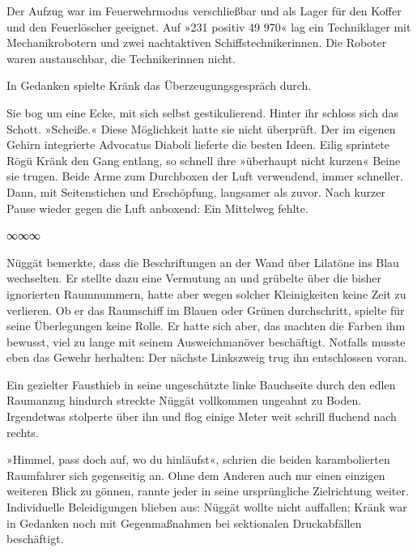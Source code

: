 Der Aufzug war im Feuerwehrmodus verschließbar und als Lager für den Koffer und den Feuerlöscher geeignet. Auf »231 positiv 49 970« lag ein Techniklager mit Mechanikrobotern und zwei nachtaktiven Schiffstechnikerinnen. Die Roboter waren austauschbar, die Technikerinnen nicht.

In Gedanken spielte Kränk das Überzeugungsgespräch durch. 

Sie bog um eine Ecke, mit sich selbst gestikulierend.  Hinter ihr schloss sich das Schott. »Scheiße.« Diese Möglichkeit hatte sie nicht überprüft. Der im eigenen Gehirn integrierte Advocatus Diaboli lieferte die besten Ideen. Eilig sprintete Rögü Kränk den Gang entlang, so schnell ihre »überhaupt nicht kurzen« Beine sie trugen. Beide Arme zum Durchboxen der Luft verwendend, immer schneller. Dann, mit Seitenstichen und Erschöpfung, langsamer als zuvor. Nach kurzer Pause wieder gegen die Luft anboxend: Ein Mittelweg fehlte.

\begin{center}
	∞∞∞
\end{center}

Nüggät bemerkte, dass die Beschriftungen an der Wand über Lilatöne ins Blau wechselten. Er stellte dazu eine Vermutung an und grübelte über die bisher ignorierten Raumnummern, hatte aber wegen solcher Kleinigkeiten keine Zeit zu verlieren. Ob er das Raumschiff im Blauen oder Grünen durchschritt, spielte für seine Überlegungen keine Rolle. Er hatte sich aber, das machten die Farben ihm bewusst, viel zu lange mit seinem Ausweichmanöver beschäftigt. Notfalls musste eben das Gewehr herhalten: Der nächste Linkszweig trug ihn entschlossen voran.

Ein gezielter Fausthieb in seine ungeschützte linke Bauchseite durch den edlen Raumanzug hindurch streckte Nüggät vollkommen ungeahnt zu Boden. Irgendetwas stolperte über ihn und flog einige Meter weit schrill fluchend nach rechts.

»Himmel, pass doch auf, wo du hinläufst«, schrien die beiden karambolierten Raumfahrer sich gegenseitig an. Ohne dem Anderen auch nur einen einzigen weiteren Blick zu gönnen, rannte jeder in seine ursprüngliche Zielrichtung weiter. Individuelle Beleidigungen blieben aus: Nüggät wollte nicht auffallen; Kränk war in Gedanken noch mit Gegenmaßnahmen bei sektionalen Druckabfällen beschäftigt.

